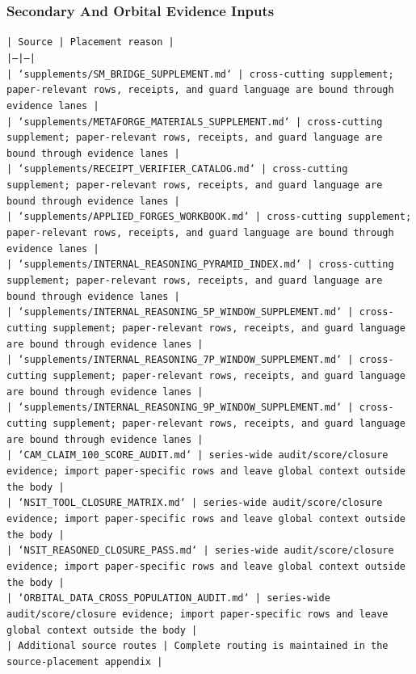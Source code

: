 \documentclass[11pt]{article}
\begin{document}
\subsubsection*{Secondary And Orbital Evidence Inputs}

\noindent\texttt{| Source | Placement reason |}\\
\noindent\texttt{|---|---|}\\
\noindent\texttt{| `supplements/SM\_BRIDGE\_SUPPLEMENT.md` | cross-cutting supplement; paper-relevant rows, receipts, and guard language are bound through evidence lanes |}\\
\noindent\texttt{| `supplements/METAFORGE\_MATERIALS\_SUPPLEMENT.md` | cross-cutting supplement; paper-relevant rows, receipts, and guard language are bound through evidence lanes |}\\
\noindent\texttt{| `supplements/RECEIPT\_VERIFIER\_CATALOG.md` | cross-cutting supplement; paper-relevant rows, receipts, and guard language are bound through evidence lanes |}\\
\noindent\texttt{| `supplements/APPLIED\_FORGES\_WORKBOOK.md` | cross-cutting supplement; paper-relevant rows, receipts, and guard language are bound through evidence lanes |}\\
\noindent\texttt{| `supplements/INTERNAL\_REASONING\_PYRAMID\_INDEX.md` | cross-cutting supplement; paper-relevant rows, receipts, and guard language are bound through evidence lanes |}\\
\noindent\texttt{| `supplements/INTERNAL\_REASONING\_5P\_WINDOW\_SUPPLEMENT.md` | cross-cutting supplement; paper-relevant rows, receipts, and guard language are bound through evidence lanes |}\\
\noindent\texttt{| `supplements/INTERNAL\_REASONING\_7P\_WINDOW\_SUPPLEMENT.md` | cross-cutting supplement; paper-relevant rows, receipts, and guard language are bound through evidence lanes |}\\
\noindent\texttt{| `supplements/INTERNAL\_REASONING\_9P\_WINDOW\_SUPPLEMENT.md` | cross-cutting supplement; paper-relevant rows, receipts, and guard language are bound through evidence lanes |}\\
\noindent\texttt{| `CAM\_CLAIM\_100\_SCORE\_AUDIT.md` | series-wide audit/score/closure evidence; import paper-specific rows and leave global context outside the body |}\\
\noindent\texttt{| `NSIT\_TOOL\_CLOSURE\_MATRIX.md` | series-wide audit/score/closure evidence; import paper-specific rows and leave global context outside the body |}\\
\noindent\texttt{| `NSIT\_REASONED\_CLOSURE\_PASS.md` | series-wide audit/score/closure evidence; import paper-specific rows and leave global context outside the body |}\\
\noindent\texttt{| `ORBITAL\_DATA\_CROSS\_POPULATION\_AUDIT.md` | series-wide audit/score/closure evidence; import paper-specific rows and leave global context outside the body |}\\
\noindent\texttt{| Additional source routes | Complete routing is maintained in the source-placement appendix |}\\
\end{document}
